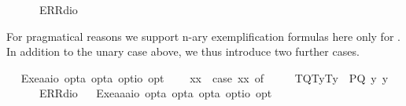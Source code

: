 \begin{isabellebody}
\ \ \ \ {\isacharunderscore}\ {\isasymRightarrow}\ ERR{\isacharparenleft}dio{\isacharparenright}{\isachardoublequoteclose}%
\begin{isamarkuptext}%
For pragmatical reasons we support n-ary exemplification formulas  here only for .
 In addition to the unary case above, we thus introduce two further cases.%
\end{isamarkuptext}\isamarkuptrue%
\ \isamarkupfalse%
\ Exe{}{\isacharcolon}{\isacharcolon}{\isachardoublequoteopen}{\isacharparenleft}{\isacharprime}a{\isasymRightarrow}{\isacharprime}a{\isasymRightarrow}io{\isacharparenright}\ opt{\isasymRightarrow}{\isacharprime}a\ opt{\isasymRightarrow}{\isacharprime}a\ opt{\isasymRightarrow}io\ opt{\isachardoublequoteclose}\ {\isacharparenleft}{\isachardoublequoteopen}{\isasymlparr}{\isacharunderscore}{\isacharcomma}{\isacharunderscore}{\isacharcomma}{\isacharunderscore}{\isasymrparr}{\isachardoublequoteclose}{\isacharparenright}\isanewline
\ \ \ {\isachardoublequoteopen}{\isasymlparr}{\isasymPhi}{\isacharcomma}x{}{\isacharcomma}x{}{\isasymrparr}\ {\isasymequiv}\ case\ {\isacharparenleft}{\isasymPhi}{\isacharcomma}x{}{\isacharcomma}x{}{\isacharparenright}\ of\ \isanewline
\ \ \ \ {\isacharparenleft}T{\isacharparenleft}Q{\isacharparenright}{\isacharcomma}T{\isacharparenleft}y{}{\isacharparenright}{\isacharcomma}T{\isacharparenleft}y{}{\isacharparenright}{\isacharparenright}\ {\isasymRightarrow}\ P{\isacharparenleft}{\isacharparenleft}Q\ y{}\ y{}{\isacharparenright}{\isacharparenright}\ {\isacharbar}\ \isanewline
\ \ \ \ {\isacharunderscore}\ {\isasymRightarrow}\ ERR{\isacharparenleft}dio{\isacharparenright}{\isachardoublequoteclose}\isanewline
\ \isamarkupfalse%
\ Exe{}{\isacharcolon}{\isacharcolon}{\isachardoublequoteopen}{\isacharparenleft}{\isacharprime}a{\isasymRightarrow}{\isacharprime}a{\isasymRightarrow}{\isacharprime}a{\isasymRightarrow}io{\isacharparenright}\ opt{\isasymRightarrow}{\isacharprime}a\ opt{\isasymRightarrow}{\isacharprime}a\ opt{\isasymRightarrow}{\isacharprime}a\ opt{\isasymRightarrow}io\ opt{\isachardoublequoteclose}\ {\isacharparenleft}{\isachardoublequoteopen}{\isasymlparr}{\isacharunderscore}{\isacharcomma}{\isacharunderscore}{\isacharcomma}{\isacharunderscore}{\isacharcomma}{\isacharunderscore}{\isasymrparr}{\isachardoublequoteclose}{\isacharparenright}\ \isanewline

\end{isabellebody}
